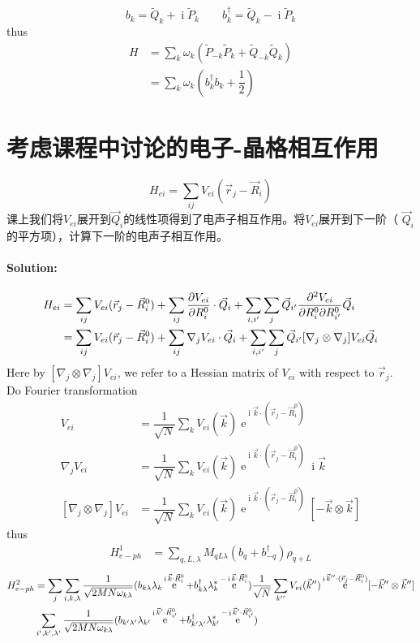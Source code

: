 \documentclass[a4paper]{article}
\DeclareMathOperator{\e}{\mathrm{e}}
\DeclareMathOperator{\I}{\mathrm{i}}
\numberwithin{equation}{section}
\begin{document}
\begin{equation}\label{key}
	b_k = \tilde{Q}_k + \I\tilde{P}_k \qquad b_k^\dagger = \tilde{Q}_k - \I\tilde{P}_k 
\end{equation}
thus
\begin{align}\label{key}
	H &= \sum_k \omega_k (\tilde{P}_{-k}\tilde{P}_k + \tilde{Q}_{-k}\tilde{Q}_k)\\
	&= \sum_k \omega_k (b_k^\dagger b_k + \dfrac{1}{2})
\end{align}


\section{考虑课程中讨论的电子-晶格相互作用}
\begin{equation}\label{key}
	H_{ei}=\sum_{ij}V_{ei}\left(\vec r_j - \vec R_i\right)
\end{equation}
课上我们将$ V_{ei} $展开到$ \vec Q_i $的线性项得到了电声子相互作用。将$  V_{ei} $展开到下一阶（ $ \vec Q_i $的平方项），计算下一阶的电声子相互作用。
\paragraph{Solution:}
\begin{align}\label{key}
	H_{ei} &= \sum_{ij} V_{ei}(\vec r_j - \vec R_i^0) + \sum_{ij} \pdv{V_{ei}}{R_i^0}\cdot \vec Q_i + \sum_{i,i'}\sum_j \vec Q_{i'} \pdv[2]{V_{ei}}{R_i^0}{R_{i'}^0} \vec Q_i \notag\\
	&= \sum_{ij} V_{ei}(\vec r_j - \vec R_i^0) + \sum_{ij} \nabla_j V_{ei}\cdot \vec Q_i + \sum_{i,i'}\sum_j \vec Q_{i'} [\nabla_j\otimes\nabla_j] V_{ei} \vec Q_i 
\end{align}
Here by $ [\nabla_j\otimes\nabla_j] V_{ei} $, we refer to a Hessian matrix of $ V_{ei}  $ with respect to $ \vec r_j $.\\
Do Fourier transformation
\begin{align}
	V_{ei} &= \dfrac{1}{\sqrt{N}} \sum_k V_{ei}(\vec k) \e^{\I \vec k \cdot (\vec r_j - \vec R_i^0)} \\
	\nabla_j V_{ei} &= \dfrac{1}{\sqrt{N}} \sum_k V_{ei}(\vec k) \e^{\I \vec k \cdot (\vec r_j - \vec R_i^0)} \I\vec k \\
	[\nabla_j\otimes\nabla_j] V_{ei} &= \dfrac{1}{\sqrt{N}} \sum_k V_{ei}(\vec k) \e^{\I \vec k \cdot (\vec r_j - \vec R_i^0)} [-\vec k\otimes\vec k]
\end{align}
thus
\begin{align}
	H_{e-ph}^1 &= \sum_{q,L,\lambda} M_{qL\lambda}(b_q +b_{-q}^\dagger) \rho_{q+L}
\end{align}
\begin{align}
	H_{e-ph}^2 &= \sum_j \sum_{i,k,\lambda} \dfrac{1}{\sqrt{2MN\omega_{k\lambda}}} (b_{k\lambda}\lambda_k \e^{\I \vec k \cdot \vec R_i^0} + b_{k\lambda}^\dagger\lambda_k^* \e^{-\I \vec k \cdot \vec R_i^0}) 
	\dfrac{1}{\sqrt{N}} \sum_{k''} V_{ei}(\vec k'') \e^{\I \vec k'' \cdot (\vec r_j - \vec R_i^0)} [-\vec k''\otimes\vec k''] \notag\\
	\quad &\sum_{i',k',\lambda'} \dfrac{1}{\sqrt{2MN\omega_{k\lambda}}} (b_{k'\lambda'}\lambda_{k'} \e^{\I \vec k' \cdot \vec R_{i'}^0} + b_{k'\lambda'}^\dagger\lambda_{k'}^* \e^{-\I \vec k' \cdot \vec R_{i'}^0}) 
\end{align}
\end{document}

